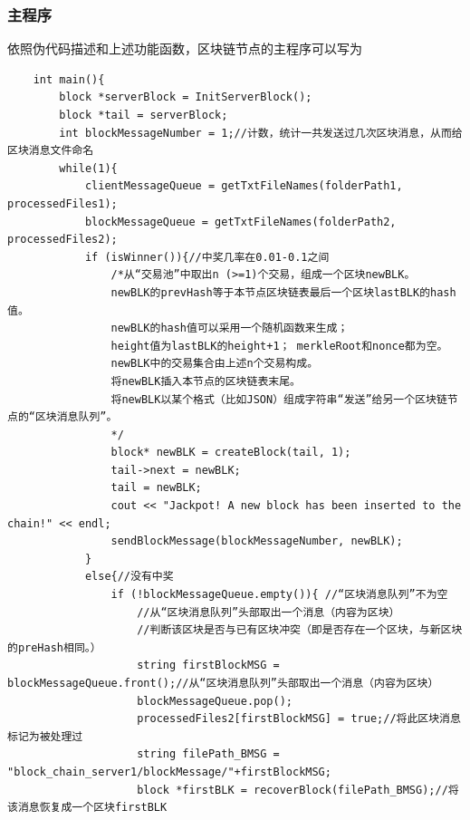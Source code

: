 \documentclass[10pt,a4paper]{article}
\begin{document}
    \subsubsection{主程序}
    \noindent 依照伪代码描述和上述功能函数，区块链节点的主程序可以写为
    \begin{verbatim}
    int main(){
        block *serverBlock = InitServerBlock();
        block *tail = serverBlock;
        int blockMessageNumber = 1;//计数，统计一共发送过几次区块消息，从而给区块消息文件命名
        while(1){
            clientMessageQueue = getTxtFileNames(folderPath1, processedFiles1);
            blockMessageQueue = getTxtFileNames(folderPath2, processedFiles2);
            if (isWinner()){//中奖几率在0.01-0.1之间
                /*从“交易池”中取出n (>=1)个交易，组成一个区块newBLK。
                newBLK的prevHash等于本节点区块链表最后一个区块lastBLK的hash值。
                newBLK的hash值可以采用一个随机函数来生成；
                height值为lastBLK的height+1； merkleRoot和nonce都为空。
                newBLK中的交易集合由上述n个交易构成。
                将newBLK插入本节点的区块链表末尾。
                将newBLK以某个格式（比如JSON）组成字符串“发送”给另一个区块链节点的“区块消息队列”。
                */
                block* newBLK = createBlock(tail, 1);
                tail->next = newBLK;
                tail = newBLK;
                cout << "Jackpot! A new block has been inserted to the chain!" << endl;
                sendBlockMessage(blockMessageNumber, newBLK);
            }
            else{//没有中奖
                if (!blockMessageQueue.empty()){ //“区块消息队列”不为空
                    //从“区块消息队列”头部取出一个消息（内容为区块）
                    //判断该区块是否与已有区块冲突（即是否存在一个区块，与新区块的preHash相同。）
                    string firstBlockMSG = blockMessageQueue.front();//从“区块消息队列”头部取出一个消息（内容为区块）
                    blockMessageQueue.pop();
                    processedFiles2[firstBlockMSG] = true;//将此区块消息标记为被处理过
                    string filePath_BMSG = "block_chain_server1/blockMessage/"+firstBlockMSG;
                    block *firstBLK = recoverBlock(filePath_BMSG);//将该消息恢复成一个区块firstBLK
    

\end{verbatim}
\end{document}
